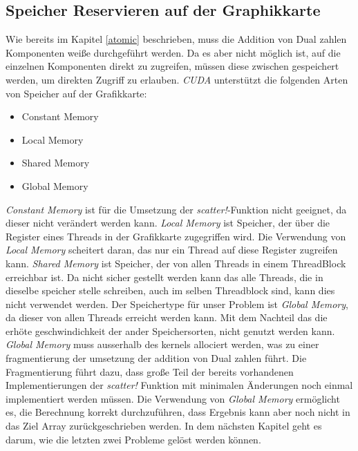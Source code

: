 \subsection{Speicher Reservieren auf der Graphikkarte} \label{memory}

Wie bereits im Kapitel \ref{atomic} beschrieben, 
muss die Addition von Dual zahlen Komponenten weiße durchgeführt werden.
Da es aber nicht möglich ist, auf die einzelnen Komponenten direkt zu zugreifen,
müssen diese zwischen gespeichert werden, um direkten Zugriff zu erlauben.
\textit{CUDA} \cite{besard2018juliagpu} unterstützt die folgenden Arten von Speicher auf der Grafikkarte:

\begin{itemize}
	\item Constant Memory
	\item Local Memory
	\item Shared Memory
	\item Global Memory
\end{itemize}

\textit{Constant Memory} ist für die Umsetzung der \textit{scatter!}-Funktion nicht geeignet,
da dieser nicht verändert werden kann.
\textit{Local Memory} ist Speicher, 
der über die Register eines Threads in der Grafikkarte zugegriffen wird.
Die Verwendung von \textit{Local Memory} scheitert daran, 
das nur ein Thread auf diese Register zugreifen kann.
\textit{Shared Memory} ist Speicher, 
der von allen Threads in einem ThreadBlock erreichbar ist.
Da nicht sicher gestellt werden kann das alle Threads, 
die in dieselbe speicher stelle schreiben, auch im selben Threadblock sind,
kann dies nicht verwendet werden.
Der Speichertype für unser Problem ist \textit{Global Memory}, 
da dieser von allen Threads erreicht werden kann.
Mit dem Nachteil das die erhöte geschwindichkeit der ander Speichersorten, 
nicht genutzt werden kann.
\textit{Global Memory} muss ausserhalb des kernels allociert werden, 
was zu einer fragmentierung der umsetzung der addition von Dual zahlen führt.
Die Fragmentierung führt dazu, 
dass große Teil der bereits vorhandenen Implementierungen der \textit{scatter!} Funktion mit minimalen Änderungen noch einmal
implementiert werden müssen.
Die Verwendung von \textit{Global Memory} ermöglicht es, die Berechnung korrekt durchzuführen,
dass Ergebnis kann aber noch nicht in das Ziel Array zurückgeschrieben werden.
In dem nächsten Kapitel geht es darum, wie die letzten zwei Probleme gelöst werden können.
